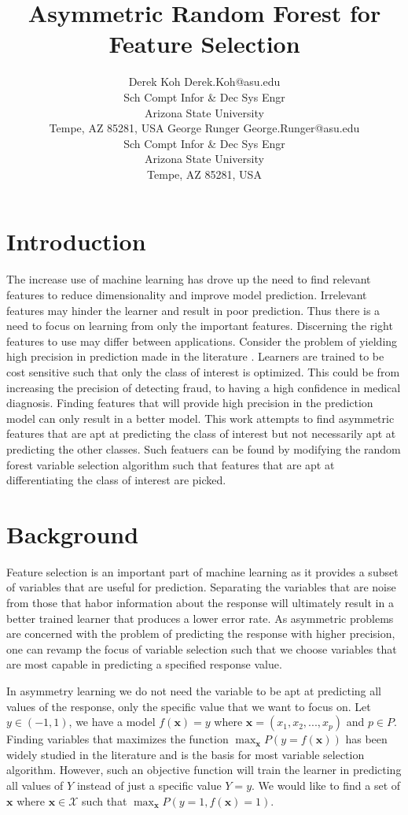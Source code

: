 \documentclass[twoside,11pt]{article}
\title{Asymmetric Random Forest for Feature Selection}
\author{\name Derek Koh \email Derek.Koh@asu.edu \\
       \addr Sch Compt Infor \& Dec Sys Engr\\
       Arizona State University\\
       Tempe, AZ 85281, USA
       \AND
\name George Runger \email George.Runger@asu.edu\\
       \addr Sch Compt Infor \& Dec Sys Engr\\
       Arizona State University\\
       Tempe, AZ 85281, USA
}
\begin{document}
\maketitle

\section{Introduction}
The increase use of machine learning has drove up the need to find relevant features to reduce dimensionality and improve model prediction. Irrelevant features may hinder the learner and result in poor prediction. Thus there is a need to focus on learning from only the important features. Discerning the right features to use may differ between applications. Consider the problem of yielding high precision in prediction made in the literature \citep{Masnadi11}. Learners are trained to be cost sensitive such that only the class of interest is optimized. This could be from increasing the precision of detecting fraud, to having a high confidence in medical diagnosis. Finding features that will provide high precision in the prediction model can only result in a better model. This work attempts to find asymmetric features that are apt at predicting the class of interest but not necessarily apt at predicting the other classes. Such featuers can be found by modifying the random forest variable selection algorithm such that features that are apt at differentiating the class of interest are picked. 

\section{Background}
Feature selection is an important part of machine learning as it provides a subset of variables that are useful for prediction. Separating the variables that are noise from those that habor information about the response will ultimately result in a better trained learner that produces a lower error rate. As asymmetric problems are concerned with the problem of predicting the response with higher precision, one can revamp the focus of variable selection such that we choose variables that are most capable in predicting a specified response value.

In asymmetry learning we do not need the variable to be apt at predicting all values of the response, only the specific value that we want to focus on. Let $y \in (-1,1)$, we have a model $f(\mathbf{x})=y$ where $\mathbf{x} = (x_1,x_2,...,x_p)$ and $p \in P$. Finding variables that maximizes the function $\displaystyle\max_{\mathbf{x}}P(y=f(\mathbf{x}))$ has been widely studied in the literature and is the basis for most variable selection algorithm. However, such an objective function will train the learner in predicting all values of $Y$ instead of just a specific value $Y=y$. We would like to find a set of $\mathbf{x}$ where $\mathbf{x} \in \mathcal{X}$ such that $\displaystyle\max_{\mathbf{x}}P(y=1,f(\mathbf{x})=1)$. 
\end{document}
